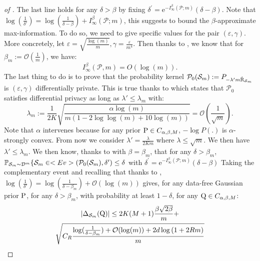 \begin{proof}[of ]
The last line holds for any $\delta > \beta$ by fixing $\delta^{\prime}=\mathrm{e}^{-I_{\infty}^\beta(\mathcal{P} ; m)}(\delta-\beta)$.
Note that $\log\left(\frac{1}{\delta'}   \right) = \log\left(\frac{1}{\delta - \beta}   \right) + I_{\infty}^\beta(\mathcal{P} ; m)$, this suggests to bound the $\beta$-approximate max-information. To do so, we need to give specific values for the pair $(\varepsilon,\gamma)$.
More concretely, let $\varepsilon= \sqrt{\frac{\log(m)}{m}}, \gamma= \frac{\varepsilon}{m^4}$.
Then thanks to , we know that for $\beta_m := \mathcal{O}(\frac{1}{m})$, we have:
\begin{equation}
\label{eq: rogers_bound}
I_{\infty}^\beta(\mathcal{P}, m)=O\left(\log(m) \right) .
\end{equation}
The last thing to do is to prove that the probability kernel $\mathcal{P}_0(\Sm):= P_{-\lambda' m \Riskhat_{\Sm}}$ is $(\varepsilon,\gamma)$ differentially private. This is true thanks to  which states that $\mathcal{P}_0$ satisfies differential privacy as long as $\lambda' \leq \lambda_{m}$ with:
\begin{equation}
\label{eq: inv_temp}
\lambda_m:= \frac{1}{2K}\sqrt{\frac{\alpha \log(m)}{m\left(1-2\log\log(m) +10\log(m) \right)}} = \mathcal{O}\left(\frac{1}{\sqrt{m}}\right).
\end{equation}
Note that $\alpha$ intervenes because for any prior $\P\in C_{\alpha,\beta,M}$, $-\log P(.)$ is $\alpha$-strongly convex.
From now we consider $\lambda'= \frac{\lambda}{2Km}$ where $\lambda \leq \sqrt{m}$. We then have $\lambda' \leq \lambda_m$.
We then know, thanks to  with $\beta=\beta_m$, that for any $\delta > \beta_m$,  $\mathbb{P}_{\Sm \sim \D^m}\{\Sm \in \texttt{Ev}(\mathcal{P}_0(\Sm),\delta') \leq \delta$
with $\delta^{\prime}=\mathrm{e}^{-I_{\infty}^\beta(\mathcal{P} ; m)}(\delta-\beta)$
Taking the complementary event and recalling that thanks to , $\log\left(\frac{1}{\delta'}   \right) = \log\left(\frac{1}{\delta - \beta_m}   \right) + \mathcal{O}(\log(m))$ gives,
for any data-free Gaussian prior $\P$, for any $\delta > \beta_m$, with probability at least $1-\delta$, for any $\Q\in C_{\alpha,\beta,M}$:
\begin{multline}
\label{eq: complete_data_dep}
|\Delta_{\Sm}(\Q)| \leq 2K(M+1)\frac{\beta\sqrt{2\beta}}{m} + \\
\sqrt{ C_R \frac{\log(\frac{1}{\delta-\beta_m}) + \mathcal{O}(\log(m)) +2d\log\left(1 +2Rm \right)}{m} }  \\

\end{multline}
\end{proof}
